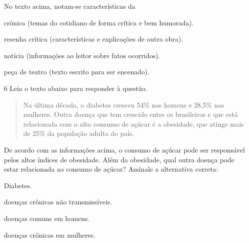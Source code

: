 
No texto acima, notam-se características da

\begin{escolha}

    \item crônica (temas do cotidiano de forma crítica e bem humorada).

    \item resenha crítica (características e explicações de outra obra).

    \item notícia (informações ao leitor sobre fatos ocorridos).

    \item peça de teatro (texto escrito para ser encenado). 

\end{escolha}

\num{6} Leia o texto abaixo para responder à questão. 

\begin{quote}

Na última década, o diabetes cresceu 54\% nos homens e 28,5\% nas
mulheres. Outra doença que tem crescido entre os brasileiros e que está
relacionada com o alto consumo de açúcar é a obesidade, que atinge
mais de 25\% da população adulta do país.

\end{quote}


De acordo com as informações acima, o consumo de açúcar pode ser
responsável pelos altos índices de obesidade. Além da obesidade, qual
outra doença pode estar relacionada ao consumo de açúcar? Assinale a
alternativa correta:

\begin{escolha}

  \item Diabetes.
  
  \item doenças crônicas não transmissíveis.
  
  \item doenças comuns em homens.
  
  \item doenças crônicas em mulheres. 

\end{escolha}

